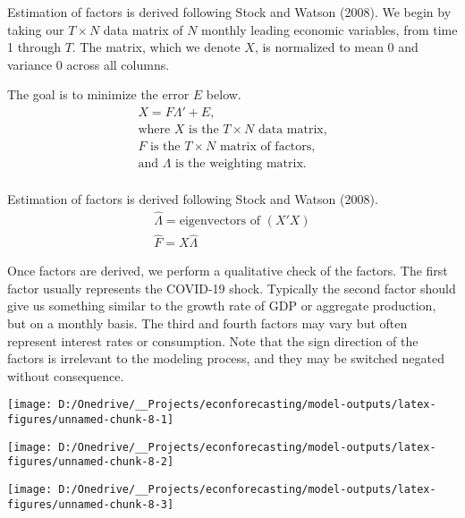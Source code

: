 \documentclass[11pt, letterpaper]{article}\usepackage[]{graphicx}\usepackage[]{color}
\begin{document}
Estimation of factors is derived following Stock and Watson (2008). We begin by taking our $T \times N$ data matrix of $N$ monthly leading economic variables, from time 1 through $T$. The matrix, which we denote $X$, is normalized to mean 0 and variance 0 across all columns.

The goal is to minimize the error $E$ below.
\begin{align*}
	X = F  \Lambda ' + E,\\
	\text{where $X$ is the $T \times N$ data matrix,}\\
	\text{$F$ is the $T \times N$ matrix of factors,}\\
	\text{and $\Lambda$ is the weighting matrix.}\\
\end{align*}

Estimation of factors is derived following Stock and Watson (2008).
\begin{align*}
	\widehat{\Lambda} = \text{eigenvectors of } (X'X)\\
	\widehat{F} = X \widehat{\Lambda}
\end{align*}

Once factors are derived, we perform a qualitative check of the factors. The first factor usually represents the COVID-19 shock. Typically the second factor should give us something similar to the growth rate of GDP or aggregate production, but on a monthly basis. The third and fourth factors may vary but often represent interest rates or consumption. Note that the sign direction of the factors is irrelevant to the modeling process, and they may be switched negated without consequence. 



{\centering \texttt{[image: D:/Onedrive/\_\_Projects/econforecasting/model-outputs/latex-figures/unnamed-chunk-8-1]} 

}




{\centering \texttt{[image: D:/Onedrive/\_\_Projects/econforecasting/model-outputs/latex-figures/unnamed-chunk-8-2]} 

}




{\centering \texttt{[image: D:/Onedrive/\_\_Projects/econforecasting/model-outputs/latex-figures/unnamed-chunk-8-3]} 

}
\end{document}
